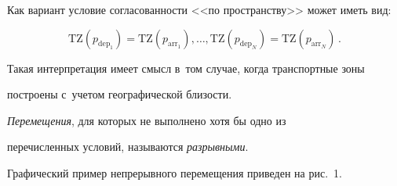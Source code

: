 Как вариант условие согласованности <<по пространству>> может иметь вид:


$$


\mathrm{TZ}\left(p_{\mathrm{dep}_1}\right) = \mathrm{TZ}\left (p_{\mathrm{arr}_1}\right), \ldots , 


\mathrm{TZ}\left(p_{\mathrm{dep}_N}\right) = \mathrm{TZ}\left (p_{\mathrm{arr}_N}\right) \,.


$$










\noindent


Такая интерпретация имеет смысл в~том случае, когда транспортные зоны 


построены с~учетом географической бли\-зости.





\textit{Перемещения}, для которых не выполнено хотя бы одно из 


пе\-ре\-чис\-лен\-ных условий, называются \textit{раз\-рыв\-ными}.





Графический пример непрерывного перемещения приведен на рис.~1.











